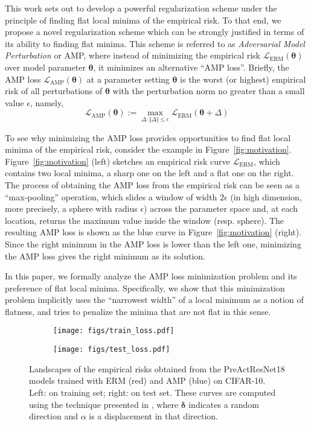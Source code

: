 \documentclass[final]{cvpr}
\begin{document}
This work sets out to develop a powerful regularization scheme under the principle of finding flat local minima of the empirical risk. To that end, we propose a novel regularization scheme which can be strongly justified in terms of its ability to finding flat minima. This scheme is referred to as {\em Adversarial Model Perturbation} or AMP, where instead of minimizing the empirical risk $\mathcal{L}_\mathrm{ERM}(\boldsymbol{\theta})$ over model parameter $\boldsymbol{\theta}$, it minimizes an alternative ``AMP loss''. Briefly, the AMP loss $\mathcal{L}_\mathrm{AMP}(\boldsymbol{\theta})$ at a parameter setting $\boldsymbol{\theta}$ is the worst (or highest) empirical risk of all perturbations of $\boldsymbol{\theta}$ with the perturbation norm no greater than a small value $\epsilon$, namely,
\begin{equation}
\mathcal{L}_\mathrm{AMP}(\boldsymbol{\theta}):=\max_{\Delta:\Vert\Delta\Vert\le\epsilon}\mathcal{L}_\mathrm{ERM}(\boldsymbol{\theta}+\Delta)
\end{equation}

To see why minimizing the AMP loss provides opportunities to find flat local minima of the empirical risk, consider the example in Figure~\ref{fig:motivation}. Figure~\ref{fig:motivation} (left) sketches an empirical risk curve $\mathcal{L}_\mathrm{ERM}$, which contains two local minima, a sharp one on the left and a flat one on the right. The process of obtaining the AMP loss from the empirical risk can be seen as a ``max-pooling'' operation, which slides a window of width $2\epsilon$ (in high dimension, more precisely, a sphere with radius $\epsilon$) across the parameter space and, at each location, returns the maximum value inside the window (resp. sphere). The resulting AMP loss is shown as the blue curve in Figure~\ref{fig:motivation} (right). Since the right minimum in the AMP loss is lower than the left one, minimizing the AMP loss gives the right minimum as its solution. 

In this paper, we formally analyze the AMP loss minimization problem and its preference of flat local minima. Specifically, we show that this minimization problem implicitly uses the ``narrowest width'' of a local minimum as a notion of flatness, and tries to penalize the minima that are not flat in this sense.

\begin{figure}[t]
\centering
\begin{subfigure}{0.48\columnwidth}\centering \texttt{[image: figs/train\_loss.pdf]}\end{subfigure}\begin{subfigure}{0.48\columnwidth}\centering \texttt{[image: figs/test\_loss.pdf]}\end{subfigure}\caption{Landscapes of the empirical risks obtained from the PreActResNet18 \cite{he2016identity} models trained with ERM (red) and AMP (blue) on CIFAR-10. Left: on training set; right: on test set. These curves are computed using the technique presented in \cite{li2018visualizing}, where $\boldsymbol{\delta}$ indicates a random direction and $\alpha$ is a displacement in that direction.}
\label{fig:validation}
\end{figure}
\end{document}

